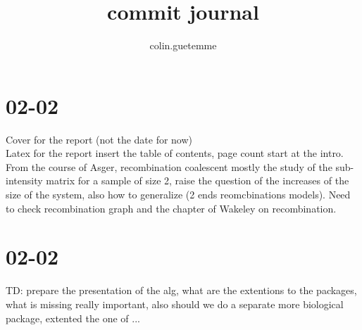 \documentclass{article}
\title{commit journal}
\author{colin.guetemme}
\begin{document}
\large
\maketitle

\section*{02-02}
\line

Cover for the report (not the date for now)\\

Latex for the report insert the table of contents, page count start at the intro.\\

From the course of Asger, recombination coalescent mostly the study of the sub-intensity matrix for a sample of size 2, raise the question of the increases of the size of the system, also how to generalize (2 ends reomcbinations models). Need to check recombination graph and the chapter of Wakeley on recombination.\\

\section*{02-02}

TD: prepare the presentation of the alg, what are the extentions to the packages, what is missing really important, also should we do a separate more biological package, extented the one of ...
\end{document}
